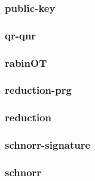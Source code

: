 \begin{frame} \frametitle{public-key}
\begin{figure}
\begin{center}

\end{center}
\end{figure}
\end{frame}
\begin{frame} \frametitle{qr-qnr}
\begin{figure}
\begin{center}

\end{center}
\end{figure}
\end{frame}
\begin{frame} \frametitle{rabinOT}
\begin{figure}
\begin{center}

\end{center}
\end{figure}
\end{frame}
\begin{frame} \frametitle{reduction-prg}
\begin{figure}
\begin{center}

\end{center}
\end{figure}
\end{frame}
\begin{frame} \frametitle{reduction}
\begin{figure}
\begin{center}

\end{center}
\end{figure}
\end{frame}
\begin{frame} \frametitle{schnorr-signature}
\begin{figure}
\begin{center}

\end{center}
\end{figure}
\end{frame}
\begin{frame} \frametitle{schnorr}
\begin{figure}
\begin{center}

\end{center}
\end{figure}
\end{frame}
